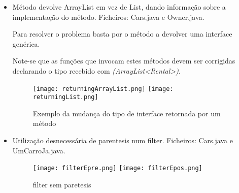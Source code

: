 \begin{itemize}
\item Método devolve ArrayList em vez de List, dando informação sobre a implementação do método.\newline
 Ficheiros: Cars.java e Owner.java.\newline


\par Para resolver o problema basta por o método a devolver uma interface genérica.\newline
\par Note-se que as funções que invocam estes métodos devem ser corrigidas declarando o tipo recebido com \textit{(ArrayList<Rental>)}.

\begin{figure}[H]

  \centering

  \texttt{[image: returningArrayList.png]}
  \texttt{[image: returningList.png]}

  \caption {Exemplo da mudança do tipo de interface retornada por um método}

  \label {fig21}

\end{figure}

\end{itemize}

\begin{itemize}
\item Utilização desnecessária de parentesis num filter.\newline
 Ficheiros: Cars.java e UmCarroJa.java.\newline


\begin{figure}[H]

  \centering

  \texttt{[image: filterEpre.png]}
  \texttt{[image: filterEpos.png]}

  \caption {filter sem paretesis}

  \label {fig22}

\end{figure}

\end{itemize}


